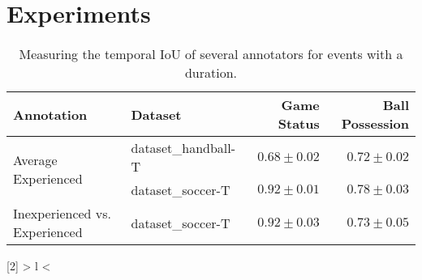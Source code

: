 \section{Experiments}\label{sec:experiments}

\begin{table}[b!]
\caption{Measuring the temporal IoU of several annotators for events with a duration.}
\label{tab:tiou}
\centering
\setlength{\tabcolsep}{2pt}
\small
\fontsize{7}{10}\selectfont
\begin{tabularx}{\linewidth}{Xl|r|r}
\toprule
Annotation & Dataset &  Game Status     & Ball Possession   \\ \midrule                        
\multicolumn{1}{l|}{\multirow{2}{*}{Average Experienced}}               & \acrshort{dataset_handball}-T  &     $0.68 \pm 0.02$            &    $0.72 \pm 0.02$          \\
\multicolumn{1}{l|}{}                                           & \acrshort{dataset_soccer}-T  &   $ 0.92 \pm 0.01 $            &  $0.78 \pm 0.03$             \\
\multicolumn{1}{l|}{Inexperienced vs. Experienced}                                           &\acrshort{dataset_soccer}-T  &     $0.92 \pm 0.03$           & $0.73 \pm 0.05$  \\
\bottomrule
\end{tabularx}
\end{table}

\newcolumntype{R}[2]{%
    >{\bgroup}%
    l%
    <{\egroup}%
}
\newcommand*\rot{\multicolumn{1}{R{90}{1em}}}%

